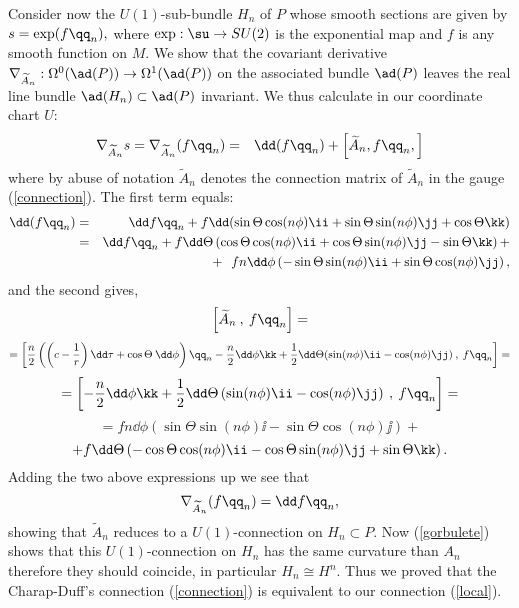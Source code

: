 \documentclass[a4paper,12pt,draft]{article}
\begin{document}
Consider now the $U(1)$-sub-bundle $H_n$ of $P$ whose
smooth sections are given by 
$s=\exp(f \qq_n ),$ where $\exp:\su\rightarrow SU(2)$ is
the exponential map and $f$ is any smooth function on $M$. 
We show that the covariant derivative
$\nabla_{\widetilde{A}_n}:\Omega^0(\ad(P))\rightarrow\Omega^1(\ad(P))$
on the associated bundle $\ad (P)$
leaves the real line bundle $\ad(H_n)\subset \ad(P)$ invariant. We
thus calculate in our coordinate chart $U$:
\begin{eqnarray*} 
\nabla_{\widetilde{A}_n} s =
 \nabla_{\widetilde{A}_n} (f \qq_n )& = & \dd ( f
\qq_n)+ 
\left[\widetilde{A}_n,f\qq_n ,\right]
\end{eqnarray*} 
where by abuse of notation $\widetilde{A}_n$ denotes the connection
matrix of  
$\widetilde{A}_n$ in the gauge (\ref{connection}).
The first term equals:
\begin{eqnarray*}
\dd (f\qq_n) & = & \dd f\qq_n   +  f \dd
(\sin\Theta\cos(n \phi)\ii
+\sin\Theta\sin( n \phi)\jj +\cos\Theta\kk)\\ & = & 
\dd f\qq_n  +
f\dd\Theta\left(\cos\Theta\cos(n\phi)\ii+\cos\Theta\sin(n
\phi)\jj-\sin\Theta\kk\right)+\\
&& + \ \ 
fn\dd\phi\left(-\sin\Theta\sin(n\phi)\ii+\sin\Theta\cos(n\phi)\jj\right),  
\end{eqnarray*}
and the second gives,
\[\left[\widetilde{A}_n\:,\:f\qq_n \right] =\]
\[=\left[ {n\over 2} \left(
\left( c-{1\over r}\right)\dd\tau +\cos\Theta\:\dd\phi\right)\qq_n
- {n\over 2}\dd\phi\kk +{1\over 2}\dd\Theta (\sin(n \phi)\ii
-\cos(n\phi)\jj )\:, \:f\qq_n \right] =\] 
\[=\left[-{n\over 2}\dd\phi\kk +{1\over 2}\dd\Theta \left(\sin(n \phi)\ii
-\cos(n \phi)\jj\right)\:,\:f\qq_n \right]=\] 
\[ =fn\dd\phi\left(\sin\Theta\sin(n\phi)\ii - 
\sin\Theta\cos(n \phi)\jj\right)+ \]
\[+f\dd\Theta\left(-\cos\Theta\cos (n\phi)\ii-\cos\Theta\sin (n\phi)\jj + 
\sin\Theta\kk\right).\] 
Adding the two above expressions up we see that 
$$ \nabla_{\widetilde{A}_n} (f \qq_n)= \dd f \qq_n, $$
showing that $\widetilde{A}_n$ reduces to a $U(1)$-connection on 
$H_n\subset P$. Now (\ref{gorbulete}) shows that 
this $U(1)$-connection on $H_n$ has the
same curvature than $A_n$ therefore they should coincide, in particular 
$H_n\cong H^n$. Thus we proved that the Charap-Duff's connection 
(\ref{connection}) is equivalent to our connection (\ref{local}).
\end{document}
